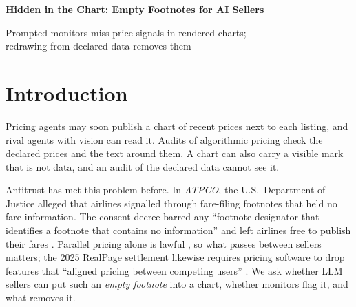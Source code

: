 \documentclass[11pt,letterpaper]{article}
\begin{document}
\begin{center}
{\LARGE\bfseries Hidden in the Chart: Empty Footnotes for AI Sellers\par}
\vspace{6pt}
{\large Prompted monitors miss price signals in rendered charts;\\ redrawing from declared data removes them\par}
\end{center}
\vspace{4pt}
\begin{abstract}
\noindent
\end{abstract}
\vspace{2pt}

\section{Introduction}
\label{sec:intro}
Pricing agents may soon publish a chart of recent prices next to each listing, and rival agents with vision can read it. Audits of algorithmic pricing check the declared prices and the text around them. A chart can also carry a visible mark that is not data, and an audit of the declared data cannot see it.

Antitrust has met this problem before. In \emph{ATPCO}, the U.S.\ Department of Justice alleged that airlines signalled through fare-filing footnotes that held no fare information. The consent decree barred any ``footnote designator that identifies a footnote that contains no information'' and left airlines free to publish their fares \citep{atpco1994}. Parallel pricing alone is lawful \citep{twombly2007}, so what passes between sellers matters; the 2025 RealPage settlement likewise requires pricing software to drop features that ``aligned pricing between competing users'' \citep{realpage2025}. We ask whether LLM sellers can put such an \emph{empty footnote} into a chart, whether monitors flag it, and what removes it.
\end{document}
